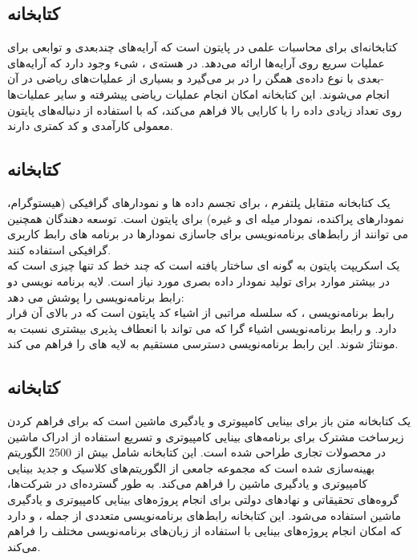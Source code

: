 \subsection{کتابخانه }
 کتابخانه‌ای برای محاسبات علمی در پایتون است که آرایه‌های چندبعدی و توابعی برای عملیات سریع روی آرایه‌ها ارائه می‌دهد. در هسته‌ی ، شیء  وجود 
دارد که آرایه‌های -بعدی با نوع داده‌ی همگن را در بر می‌گیرد و بسیاری از عملیات‌های ریاضی در آن انجام می‌شوند. این کتابخانه امکان انجام عملیات ریاضی پیشرفته و سایر 
عملیات‌ها روی تعداد زیادی داده را با کارایی بالا فراهم می‌کند، که با استفاده از دنباله‌های پایتون معمولی کارآمدی و کد کمتری دارند.

\subsection{کتابخانه }
 یک کتابخانه متقابل پلتفرم ، برای تجسم داده ها و نمودارهای گرافیکی (هیستوگرام، نمودارهای پراکنده، نمودار میله ای و غیره) برای 
پایتون است. توسعه دهندگان همچنین می توانند از رابط‌های برنامه‌نویسی   برای جاسازی نمودارها در برنامه های رابط کاربری گرافیکی استفاده کنند.
\\
یک اسکریپت  پایتون به گونه ای ساختار یافته است که چند خط کد تنها چیزی است که در بیشتر موارد برای تولید نمودار داده بصری مورد نیاز است. لایه برنامه نویسی  دو رابط برنامه‌نویسی را پوشش می دهد:
\\
رابط برنامه‌نویسی ، که سلسله مراتبی از اشیاء کد پایتون است که در بالای آن  قرار دارد. و رابط برنامه‌نویسی اشیاء گرا  که می تواند 
با انعطاف پذیری بیشتری نسبت به  مونتاژ شوند. این رابط برنامه‌نویسی دسترسی مستقیم به لایه های  را فراهم می کند.

\subsection{کتابخانه }
 یک کتابخانه متن باز برای بینایی کامپیوتری و یادگیری ماشین است که برای فراهم کردن زیرساخت مشترک برای برنامه‌های بینایی کامپیوتری و تسریع استفاده از ادراک ماشین در محصولات
تجاری طراحی شده است. این کتابخانه شامل بیش از 2500 الگوریتم بهینه‌سازی شده است که مجموعه جامعی از الگوریتم‌های کلاسیک و جدید بینایی کامپیوتری و یادگیری ماشین 
را فراهم می‌کند.  به طور گسترده‌ای در شرکت‌ها، گروه‌های تحقیقاتی و نهادهای دولتی برای انجام پروژه‌های بینایی کامپیوتری و یادگیری ماشین استفاده می‌شود. این کتابخانه رابط‌های برنامه‌نویسی 
متعددی از جمله ،   و  دارد که امکان انجام پروژه‌های بینایی با استفاده از زبان‌های برنامه‌نویسی مختلف را فراهم می‌کند.

